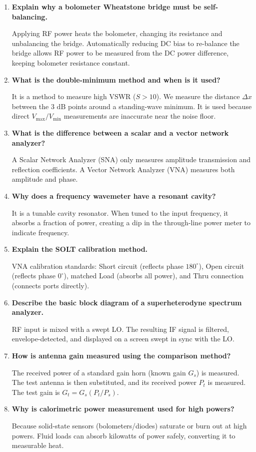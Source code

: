 \documentclass[12pt,a4paper]{article}
\newcommand{\Q}[1]{\textbf{#1}\par\noindent\ignorespaces}
\begin{document}
\begin{tcolorbox}[exambox, title={\textbf{Frequently Asked / Viva Questions}}]
\begin{enumerate}[topsep=0pt, label=\textbf{Q\arabic*.}, itemsep=5pt]
  \item \Q{Explain why a bolometer Wheatstone bridge must be self-balancing.}
    Applying RF power heats the bolometer, changing its resistance and unbalancing the bridge. Automatically reducing DC bias to re-balance the bridge allows RF power to be measured from the DC power difference, keeping bolometer resistance constant.
  \item \Q{What is the double-minimum method and when is it used?}
    It is a method to measure high VSWR ($S > 10$). We measure the distance $\Delta x$ between the $3\text{ dB}$ points around a standing-wave minimum. It is used because direct $V_{\text{max}}/V_{\text{min}}$ measurements are inaccurate near the noise floor.
  \item \Q{What is the difference between a scalar and a vector network analyzer?}
    A Scalar Network Analyzer (SNA) only measures amplitude transmission and reflection coefficients. A Vector Network Analyzer (VNA) measures both amplitude and phase.
  \item \Q{Why does a frequency wavemeter have a resonant cavity?}
    It is a tunable cavity resonator. When tuned to the input frequency, it absorbs a fraction of power, creating a dip in the through-line power meter to indicate frequency.
  \item \Q{Explain the SOLT calibration method.}
    VNA calibration standards: Short circuit (reflects phase $180^\circ$), Open circuit (reflects phase $0^\circ$), matched Load (absorbs all power), and Thru connection (connects ports directly).
  \item \Q{Describe the basic block diagram of a superheterodyne spectrum analyzer.}
    RF input is mixed with a swept LO. The resulting IF signal is filtered, envelope-detected, and displayed on a screen swept in sync with the LO.
  \item \Q{How is antenna gain measured using the comparison method?}
    The received power of a standard gain horn (known gain $G_s$) is measured. The test antenna is then substituted, and its received power $P_t$ is measured. The test gain is $G_t = G_s (P_t/P_s)$.
  \item \Q{Why is calorimetric power measurement used for high powers?}
    Because solid-state sensors (bolometers/diodes) saturate or burn out at high powers. Fluid loads can absorb kilowatts of power safely, converting it to measurable heat.

\end{enumerate}
\end{tcolorbox}
\end{document}
